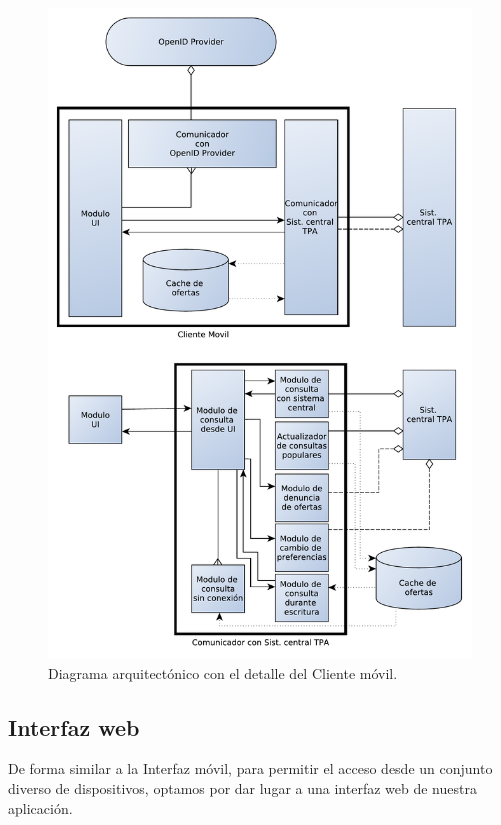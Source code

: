 \begin{figure}[H]
	\centering
	\includegraphics[width=\textwidth]{graficos/arch/Cliente_movil.pdf}
	\caption{Diagrama arquitectónico con el detalle del \textsf{Cliente móvil}.}
\end{figure}

\subsection{Interfaz web}

De forma similar a la Interfaz móvil, para permitir el acceso desde un conjunto diverso de dispositivos, optamos por dar lugar a una interfaz web de nuestra aplicación.

